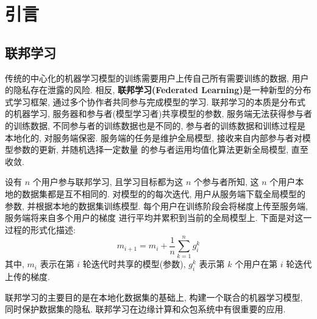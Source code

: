 \documentclass[../main.tex]{subfiles}
\begin{document}




\section{引言}
\subsection{联邦学习}
传统的中心化的机器学习模型的训练需要用户上传自己所有需要训练的数据,
用户的隐私存在泄露的风险.
相反, \textbf{联邦学习(Federated Learning)}是一种新型的分布式学习框架, 通过多个协作者共同参与完成模型的学习.
联邦学习的本质是分布式的机器学习, 服务器和参与者(模型学习者)共享模型的参数,
服务端无法获得参与者的训练数据, 不同参与者的训练数据也是不同的, 参与者的训练数据和训练过程是本地化的,
对服务端保密.
服务端的任务是维护全局模型, 接收来自内部参与者对模型参数的更新, 并随机选择一定数量
的参与者运用均值化算法更新全局模型, 直至收敛.

设有 $ n $ 个用户参与联邦学习, 且学习目标都为这 $ n $ 个参与者所知,
这 $ n $ 个用户本地的数据集都是互不相同的. 对模型的的每次迭代,
用户从服务端下载全局模型的参数, 并根据本地的数据集训练模型.
每个用户在训练阶段会将梯度上传至服务端, 服务端将来自多个用户的梯度
进行平均并累积到当前的全局模型上. 下面是对这一过程的形式化描述:
\begin{equation}
  m_{i+1} = m_i + \frac{1}{n}\sum_{k=1}^{n}g_i^k
\end{equation}
其中, $ m_{i} $ 表示在第 $ i $ 轮迭代时共享的模型(参数),
$ g_i^k $ 表示第 $ k $ 个用户在第 $ i $ 轮迭代上传的梯度.

联邦学习的主要目的是在本地化数据集的基础上, 构建一个联合的机器学习模型,
同时保护数据集的隐私. 联邦学习在边缘计算和众包系统中有很重要的应用.
%
\end{document}
